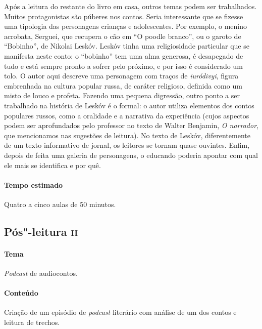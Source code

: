 \documentclass[11pt]{extarticle}
\begin{document}

Após a leitura do restante do livro em casa, outros temas podem ser
trabalhados. Muitos protagonistas são púberes nos contos. Seria
interessante que se fizesse uma tipologia das personagens crianças e
adolescentes. Por exemplo, o menino acrobata, Serguei, que recupera o
cão em ``O poodle branco'', ou o garoto de ``Bobinho'', de Nikolai
Leskóv. Leskóv tinha uma religiosidade particular que se
manifesta neste conto: o ``bobinho'' tem uma alma generosa, é desapegado
de tudo e está sempre pronto a sofrer pelo próximo, e por isso é
considerado um tolo. O autor aqui descreve uma personagem com traços de
\emph{iuródivyi}, figura embrenhada na cultura popular russa, de caráter
religioso, definida como um misto de louco e profeta. Fazendo uma
pequena digressão, outro ponto a ser trabalhado na história de Leskóv é
o formal: o autor utiliza elementos dos contos populares russos, como a
oralidade e a narrativa da experiência (cujos aspectos podem ser
aprofundados pelo professor no texto de Walter Benjamin, \emph{O
narrador}, que mencionamos nas sugestões de leitura). No texto de
Leskóv, diferentemente de um texto informativo de jornal, os leitores se
tornam quase ouvintes. Enfim, depois de feita uma galeria de
personagens, o educando poderia apontar com qual ele mais se identifica
e por quê.

\paragraph{Tempo estimado} Quatro a cinco aulas de 50 minutos.

\subsection{Pós"-leitura \textsc{ii}}

\paragraph{Tema} \emph{Podcast} de audiocontos.


\paragraph{Conteúdo}
Criação de um episódio de \emph{podcast} literário com análise de um dos
contos e leitura de trechos.
\end{document}
